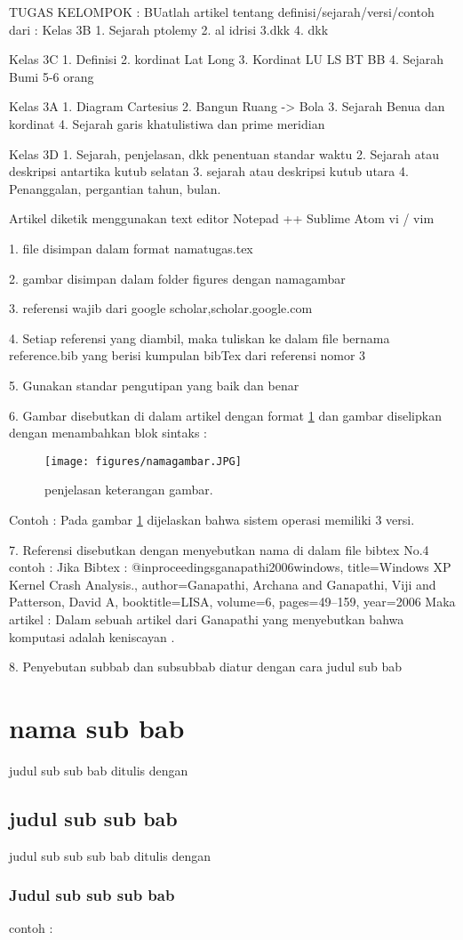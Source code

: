 TUGAS KELOMPOK : 
BUatlah artikel tentang definisi/sejarah/versi/contoh dari :
Kelas 3B
1. Sejarah ptolemy
2. al idrisi
3.dkk
4. dkk

Kelas 3C
1. Definisi
2. kordinat Lat Long
3. Kordinat LU LS BT BB
4. Sejarah Bumi
5-6 orang

Kelas 3A
1. Diagram Cartesius
2. Bangun Ruang -> Bola
3. Sejarah Benua dan kordinat
4. Sejarah garis khatulistiwa dan prime meridian

Kelas 3D
1. Sejarah, penjelasan, dkk penentuan standar waktu
2. Sejarah atau deskripsi antartika kutub selatan
3. sejarah atau deskripsi kutub utara
4. Penanggalan, pergantian tahun, bulan.


Artikel diketik menggunakan text editor
Notepad ++
Sublime
Atom
vi / vim

1. file disimpan dalam format namatugas.tex

2. gambar disimpan dalam folder figures dengan namagambar

3. referensi wajib dari google scholar,scholar.google.com

4. Setiap referensi yang diambil, maka tuliskan ke dalam 
	file bernama reference.bib
   yang berisi kumpulan bibTex dari referensi nomor 3

5. Gunakan standar pengutipan yang baik dan benar

6. Gambar disebutkan di dalam artikel dengan format \ref{namagambar}
   dan gambar diselipkan dengan menambahkan blok sintaks :
	\begin{figure}[ht]
	\centerline{\texttt{[image: figures/namagambar.JPG]}}
	\caption{penjelasan keterangan gambar.}
	\label{namagambar}
	\end{figure}
	Contoh :
	Pada gambar \ref{namagambar} dijelaskan bahwa sistem operasi memiliki 
	3 versi.
	
7. Referensi disebutkan dengan menyebutkan nama di dalam file bibtex No.4
   contoh :
	Jika Bibtex :
	@inproceedings{ganapathi2006windows,
	  title={Windows XP Kernel Crash Analysis.},
	  author={Ganapathi, Archana and Ganapathi, Viji and Patterson, David A},
	  booktitle={LISA},
	  volume={6},
	  pages={49--159},
	  year={2006}
	}
	Maka artikel :
	Dalam sebuah artikel dari Ganapathi yang menyebutkan bahwa komputasi 
	adalah keniscayan \cite{ganapathi2006windows}.
	
	
8. Penyebutan subbab dan subsubbab diatur dengan cara 
	judul sub bab \section{nama sub bab}
	judul sub sub bab ditulis dengan \subsection{judul sub sub bab}
	judul sub sub sub bab ditulis dengan \subsubsection{Judul sub sub sub bab}
	contoh :
